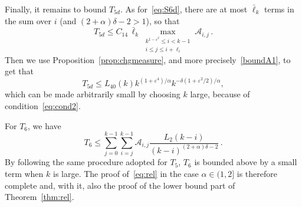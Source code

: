 \documentclass[AHL,Unicode,longabstracts]{cedram}
\newcommand{\ga}{\alpha}
\newcommand{\gd}{\delta}
\newcommand{\gep}{\varepsilon}
\newcommand{\cA}{\ensuremath{\mathcal{A}}}
\newcommand{\maxtwo}[2]{\max_{\substack{#1 \\ #2}}}
\begin{document}
Finally, it remains to bound $T_{5d}$. As for~\eqref{eq:S6d}, there are at most $\bar\ell_k$ terms in the sum over $i$ (and $(2+\ga)\gd-2>1$), so that
\begin{equation}
T_{5d} \le C_{14}\,\bar\ell_{k} \maxtwo{ k^{1- \gep^2} \le i < k-1}{i \le j \le i+ \ell_i} \cA_{i,j}\,.
\end{equation}
Then we use Proposition~\ref{prop:chgmeasure}, and more precisely~\eqref{boundA1}, to get that
\begin{equation}
T_{5d} \le L_{40}(k) k^{(1+\gep^4)/\ga} k^{-\gd (1+\gep^2/2)/ \ga},
\end{equation}
which can be made arbitrarily small by choosing $k$ large, because of condition~\eqref{eq:cond2}.



For $T_6$, we have
\begin{equation}
T_6 \le \sum_{j=0}^{k-1} \sum_{i=j}^{k-1} \cA_{i,j} \frac{L_2(k-i)}{(k-i)^{(2+\ga)\delta -2}}\,.
\end{equation}
By following the same procedure adopted for $T_{5}$, $T_{6}$ is bounded above by a small term when $k$ is large. The proof of~\eqref{eq:rel} in the case $\ga\in(1,2]$ is therefore complete and, with it, also the proof of the lower bound part of Theorem~\ref{thm:rel}.
\end{document}
